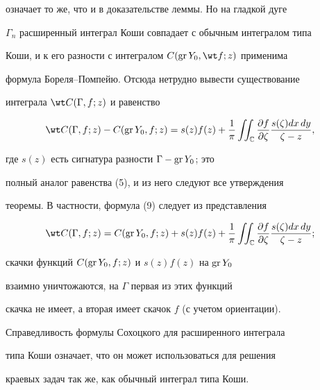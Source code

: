 означает то же, что и в доказательстве леммы. Но на гладкой дуге


$\Gamma_n$ расширенный интеграл Коши совпадает с обычным интегралом типа


Коши, и к его разности с интегралом $C(\gr Y_0, \wt f;z)$ применима


формула Бореля--Помпейю. Отсюда нетрудно вывести существование


интеграла $\wt C(\Gamma, f; z)$ и равенство


$$


\wt C(\Gamma, f;z) - C(\gr Y_0 , f;z) = s(z)f(z) + \frac{1}{\pi}


\iint_{\Bbb C}{\frac{\partial f}{\partial \zeta}


\frac{s(\zeta)dx\,dy}{\zeta - z}},


$$


где $s(z)$ есть сигнатура разности $\Gamma - \operatorname{gr} Y_0$; это


полный аналог равенства (5), и из него следуют все утверждения


теоремы. В частности, формула (9) следует из представления


$$


\wt C(\Gamma, f;z) = C(\gr Y_0 , f;z) + s(z)f(z) + \frac{1}{\pi}


\iint_{\Bbb C}{\frac{\partial f}{\partial \zeta}


\frac{s(\zeta)dx\,dy}{\zeta - z}};


$$


скачки функций $C(\operatorname{gr} Y_0 , f;z)$ и $s(z)f(z)$ на $\operatorname{gr} Y_0$


взаимно уничтожаются, на $\Gamma$ первая из этих функций


скачка не имеет, а вторая имеет скачок $f$ (с учетом ориентации).





Справедливость формулы Сохоцкого для расширенного интеграла


типа Коши означает, что он может использоваться для решения


краевых задач так же, как обычный интеграл типа Коши.





